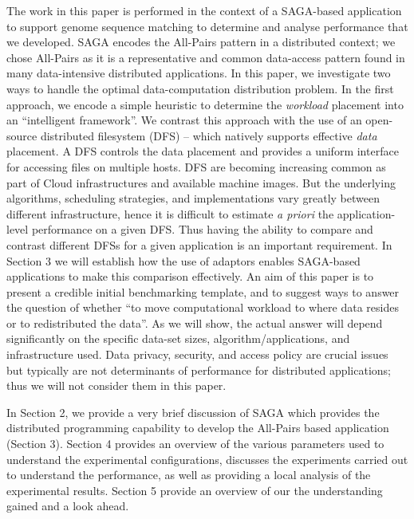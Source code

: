 \documentclass{rspublic}
\begin{document}
The work in this paper is performed in the context of a SAGA-based
application to support genome sequence matching to determine and
analyse performance that we developed. SAGA encodes the All-Pairs
pattern in a distributed context; we chose All-Pairs as it is a
representative and common data-access pattern found in many
data-intensive distributed applications.  In this paper, we
investigate two ways to handle the optimal data-computation
distribution problem.  In the first approach, we encode a simple
heuristic to determine the {\it workload} placement into an
``intelligent framework''. We contrast this approach with the use of
an open-source distributed filesystem (DFS) -- which natively supports
effective {\it data} placement.  A DFS controls the data placement and
provides a uniform interface for accessing files on multiple
hosts. DFS are becoming increasing common as part of Cloud
infrastructures and available machine images. But the underlying
algorithms, scheduling strategies, and implementations vary greatly
between different infrastructure, hence it is difficult to estimate
{\it a priori} the application-level performance on a given DFS.  Thus
having the ability to compare and contrast different DFSs for a given
application is an important requirement. In Section 3 we will
establish how the use of adaptors enables SAGA-based applications to
make this comparison effectively.  An aim of this paper is to present
a credible initial benchmarking template, and to suggest ways to
answer the question of whether ``to move computational workload to
where data resides or to redistributed the data''.  As we will show,
the actual answer will depend significantly on the specific data-set
sizes, algorithm/applications, and infrastructure used.  Data privacy,
security, and access policy are crucial issues but typically are not
determinants of performance for distributed applications; thus we will
not consider them in this paper.

In Section 2, we provide a very brief discussion of SAGA which
provides the distributed programming capability to develop the
All-Pairs based application (Section 3). Section 4 provides an
overview of the various parameters used to understand the experimental
configurations, discusses the experiments carried out to understand
the performance, as well as providing a local analysis of the
experimental results. Section 5 provide an overview of our the
understanding gained and a look ahead.

\end{document}
